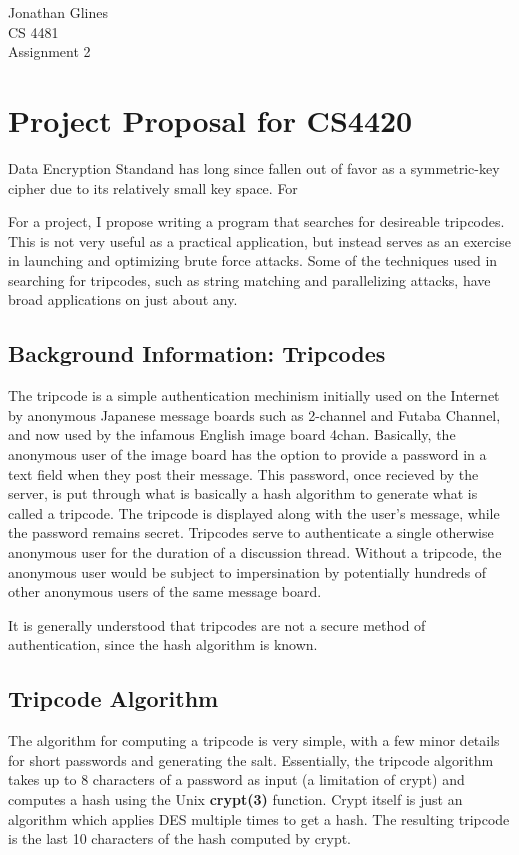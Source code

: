 \documentclass[12pt]{article}
\begin{document}
\begin{flushright}
{
\Large Jonathan Glines\\
\Large CS 4481\\
\Large Assignment 2\\
}
\end{flushright}
\section*{Project Proposal for CS4420}
Data Encryption Standand has long since fallen out of favor as a symmetric-key cipher due to its relatively small key space.  For

For a project, I propose writing a program that searches for desireable tripcodes. This is not very useful as a practical application, but instead serves as an exercise in launching and optimizing brute force attacks. Some of the techniques used in searching for tripcodes, such as string matching and parallelizing attacks, have broad applications on just about any.

\subsection*{Background Information: Tripcodes}
The tripcode is a simple authentication mechinism initially used on the Internet by anonymous Japanese message boards such as 2-channel and Futaba Channel, and now used by the infamous English image board 4chan. Basically, the anonymous user of the image board has the option to provide a password in a text field when they post their message. This password, once recieved by the server, is put through what is basically a hash algorithm to generate what is called a tripcode. The tripcode is displayed along with the user's message, while the password remains secret. Tripcodes serve to authenticate a single otherwise anonymous user for the duration of a discussion thread. Without a tripcode, the anonymous user would be subject to impersination by potentially hundreds of other anonymous users of the same message board.

It is generally understood that tripcodes are not a secure method of authentication, since the hash algorithm is known.

\subsection*{Tripcode Algorithm}
The algorithm for computing a tripcode is very simple, with a few minor details for short passwords and generating the salt. Essentially, the tripcode algorithm takes up to 8 characters of a password as input (a limitation of crypt) and computes a hash using the Unix {\bf crypt(3)} function. Crypt itself is just an algorithm which applies DES multiple times to get a hash. The resulting tripcode is the last 10 characters of the hash computed by crypt. 
\end{document}
